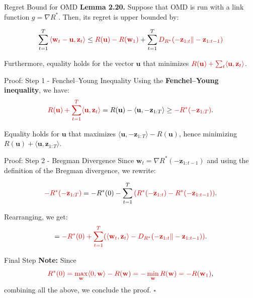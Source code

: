 \documentclass{beamer}
\begin{document}
\begin{small}
\begin{frame}{Regret Bound for OMD}
\textbf{Lemma 2.20.} Suppose that OMD is run with a link function \( g = \nabla R^* \). Then, its regret is upper bounded by:

\[
\sum_{t=1}^{T} \textcolor{mathcolor}{ \langle \mathbf{w}_t - \mathbf{u}, \mathbf{z}_t \rangle }
\leq \textcolor{mathcolor}{ R(\mathbf{u}) - R(\mathbf{w}_1) }
+ \sum_{t=1}^{T} \textcolor{mathcolor}{ D_{R^*}(-\mathbf{z}_{1:t} \| -\mathbf{z}_{1:t-1}) }
\]

Furthermore, equality holds for the vector \( \mathbf{u} \) that minimizes \( \textcolor{mathcolor}{ R(\mathbf{u}) + \sum_t \langle \mathbf{u}, \mathbf{z}_t \rangle } \).
\end{frame}

\begin{frame}{Proof: Step 1 - Fenchel–Young Inequality}
Using the \textbf{Fenchel–Young inequality}, we have:
\[
\textcolor{mathcolor}{ R(\mathbf{u}) + \sum_{t=1}^{T} \langle \mathbf{u}, \mathbf{z}_t \rangle }
= R(\mathbf{u}) - \langle \mathbf{u}, -\mathbf{z}_{1:T} \rangle
\geq \textcolor{mathcolor}{ -R^*(-\mathbf{z}_{1:T}) }.
\]

Equality holds for \( \mathbf{u} \) that maximizes \( \langle \mathbf{u}, -\mathbf{z}_{1:T} \rangle - R(\mathbf{u}) \), hence minimizing \( R(\mathbf{u}) + \langle \mathbf{u}, \mathbf{z}_{1:T} \rangle \).
\end{frame}

\begin{frame}{Proof: Step 2 - Bregman Divergence}
Since \( \mathbf{w}_t = \nabla R^*(-\mathbf{z}_{1:t-1}) \) and using the definition of the Bregman divergence, we rewrite:

\[
\textcolor{mathcolor}{ -R^*(-\mathbf{z}_{1:T}) }
= -R^*(0) - \sum_{t=1}^{T} \textcolor{mathcolor}{ (R^*(-\mathbf{z}_{1:t}) - R^*(-\mathbf{z}_{1:t-1})) }.
\]

Rearranging, we get:
\[
= \textcolor{mathcolor}{ -R^*(0) + \sum_{t=1}^{T} (\langle \mathbf{w}_t, \mathbf{z}_t \rangle - D_{R^*}(-\mathbf{z}_{1:t} \| -\mathbf{z}_{1:t-1})) }.
\]
\end{frame}

\begin{frame}{Final Step}
\textbf{Note:} Since
\[
\textcolor{mathcolor}{ R^*(0) = \max_{\mathbf{w}} \langle 0, \mathbf{w} \rangle - R(\mathbf{w}) = - \min_{\mathbf{w}} R(\mathbf{w}) = -R(\mathbf{w}_1) },
\]
combining all the above, we conclude the proof. \(\square\)
\end{frame}

\end{small}
\end{document}
